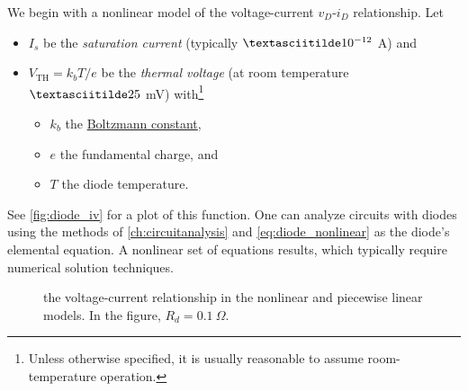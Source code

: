 \documentclass[electronics.tex]{subfiles}
\begin{document}
We begin with a nonlinear model of the voltage-current $v_D$-$i_D$ relationship.
Let 
\begin{itemize}
	\item $I_s$ be the \emph{saturation current} (typically $\textasciitilde10^{-12}$ A) and
	\item $V_\text{TH} = k_b T / e$ be the \emph{thermal voltage} (at room temperature $\textasciitilde 25$ mV) with\footnote{Unless otherwise specified, it is usually reasonable to assume room-temperature operation.}
	\begin{itemize}
		\item $k_b$ the \href{https://en.wikipedia.org/wiki/Boltzmann\_constant}{Boltzmann constant},
		\item $e$ the fundamental charge, and
		\item $T$ the diode temperature.
	\end{itemize}
\end{itemize}
See \autoref{fig:diode_iv} for a plot of this function.
One can analyze circuits with diodes using the methods of \cref{ch:circuitanalysis} and \cref{eq:diode_nonlinear} as the diode's elemental equation.
A nonlinear set of equations results, which typically require numerical solution techniques.
\tags{}

\begin{figure}[tb]
\caption{the voltage-current relationship in the nonlinear and piecewise linear models. In the figure, $R_d = 0.1\ \Omega$.}
\label{fig:diode_iv}
\end{figure}
\end{document}
